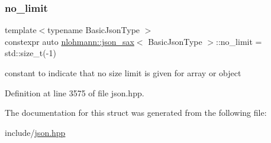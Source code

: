 \subsubsection{\texorpdfstring{no\+\_\+limit}{no\_limit}}
{\footnotesize\ttfamily template$<$typename Basic\+Json\+Type $>$ \\
constexpr auto \hyperlink{structnlohmann_1_1json__sax}{nlohmann\+::json\+\_\+sax}$<$ Basic\+Json\+Type $>$\+::no\+\_\+limit = std\+::size\+\_\+t(-\/1)\hspace{0.3cm}{\ttfamily [static]}}



constant to indicate that no size limit is given for array or object 



Definition at line 3575 of file json.\+hpp.



The documentation for this struct was generated from the following file\+:\begin{DoxyCompactItemize}
\item 
include/\hyperlink{json_8hpp}{json.\+hpp}\end{DoxyCompactItemize}
